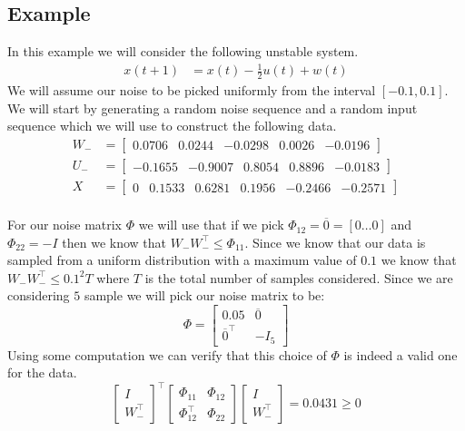 \subsection{Example} \label{ExampleQS}
In this example we will consider the following unstable system.
\begin{align*}
	x(t+1) &= x(t) - \frac{1}{2}u(t) + w(t) 
\end{align*}
We will assume our noise to be picked uniformly from the interval $[-0.1 , 0.1]$. We will start by generating a random noise sequence and a random input sequence which we will use to construct the following data.
\begin{align*}
	W_- &= \begin{bmatrix}  0.0706 &  0.0244 & -0.0298 & 0.0026 & -0.0196 \end{bmatrix} \\
	U_- &= \begin{bmatrix} -0.1655 & -0.9007 &  0.8054 & 0.8896 & -0.0183 \end{bmatrix} \\
	X   &= \begin{bmatrix}     0   &  0.1533 &  0.6281 & 0.1956 & -0.2466 & -0.2571 \end{bmatrix} \\
\end{align*}

For our noise matrix $\Phi$ we will use that if we pick $\Phi_{12} = \overline{0} = [0 \dots 0]$ and $\Phi_{22} = -I$ then we know that $W_- W_-^\top \leq \Phi_{11}$. Since we know that our data is sampled from a uniform distribution with a maximum value of $0.1$ we know that $W_- W_-^\top \leq 0.1^2 T$ where $T$ is the total number of samples considered. Since we are considering $5$ sample we will pick our noise matrix to be:
\begin{equation*}
	\Phi = \begin{bmatrix} 0.05 & \overline{0} \\ \overline{0}^\top & -I_5 \end{bmatrix}
\end{equation*}
Using some computation we can verify that this choice of $\Phi$ is indeed a valid one for the data.
\begin{equation}
\begin{bmatrix} I \\ W_-^\top \end{bmatrix} ^\top
\begin{bmatrix} \Phi_{11} & \Phi_{12} \\ \Phi_{12}^\top & \Phi_{22} \end{bmatrix}
\begin{bmatrix} I \\ W_-^\top \end{bmatrix} = 0.0431 \geq 0
\end{equation}

